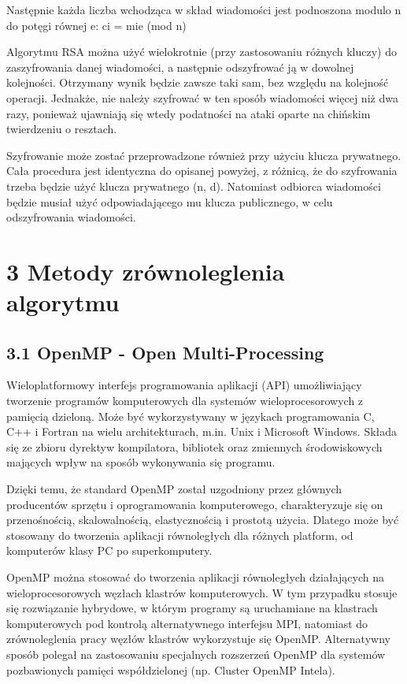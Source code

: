 \documentclass[a4paper,12pt]{article}
\begin{document}
Następnie każda liczba wchodząca w skład wiadomości jest podnoszona modulo n do potęgi równej e:
    ci = mie  (mod n)

Algorytmu RSA można użyć wielokrotnie (przy zastosowaniu różnych kluczy) do zaszyfrowania danej wiadomości, a następnie odszyfrować ją w dowolnej kolejności. Otrzymany wynik będzie zawsze taki sam, bez względu na kolejność operacji. Jednakże, nie należy szyfrować w ten sposób wiadomości więcej niż dwa razy, ponieważ ujawniają się wtedy podatności na ataki oparte na chińskim twierdzeniu o resztach.

Szyfrowanie może zostać przeprowadzone również przy użyciu klucza prywatnego. Cała procedura jest identyczna do opisanej powyżej, z różnicą, że do szyfrowania trzeba będzie użyć klucza prywatnego (n, d). Natomiast odbiorca wiadomości będzie musiał użyć odpowiadającego mu klucza publicznego, w celu odszyfrowania wiadomości.
 

\newpage
\section*{3 Metody zrównoleglenia algorytmu}

\subsection*{3.1 OpenMP - Open Multi-Processing}

Wieloplatformowy interfejs programowania aplikacji (API) umożliwiający tworzenie programów komputerowych dla systemów wieloprocesorowych z pamięcią dzieloną. Może być wykorzystywany w językach programowania C, C++ i Fortran na wielu architekturach, m.in. Unix i Microsoft Windows. Składa się ze zbioru dyrektyw kompilatora, bibliotek oraz zmiennych środowiskowych mających wpływ na sposób wykonywania się programu.

    Dzięki temu, że standard OpenMP został uzgodniony przez głównych producentów sprzętu i oprogramowania komputerowego, charakteryzuje się on przenośnością, skalowalnością, elastycznością i prostotą użycia. Dlatego może być stosowany do tworzenia aplikacji równoległych dla różnych platform, od komputerów klasy PC po superkomputery.

    OpenMP można stosować do tworzenia aplikacji równoległych działających na wieloprocesorowych węzłach klastrów komputerowych. W tym przypadku stosuje się rozwiązanie hybrydowe, w którym programy są uruchamiane na klastrach komputerowych pod kontrolą alternatywnego interfejsu MPI, natomiast do zrównoleglenia pracy węzłów klastrów wykorzystuje się OpenMP. Alternatywny sposób polegał na zastosowaniu specjalnych rozszerzeń OpenMP dla systemów pozbawionych pamięci współdzielonej (np. Cluster OpenMP Intela).
\end{document}
